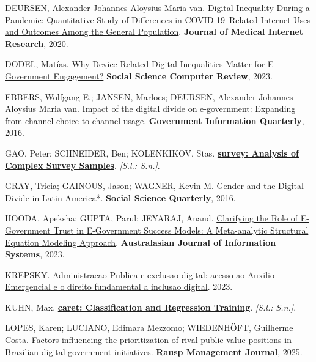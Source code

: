\documentclass[
  man,
  floatsintext,
  longtable,
  a4paper,
  nolmodern,
  notxfonts,
  notimes,
  colorlinks=true,linkcolor=blue,citecolor=blue,urlcolor=blue]{apa7}
\newlength{\cslhangindent}
\newenvironment{CSLReferences}[2] %
 {\begin{list}{}{%
  \setlength{\itemindent}{0pt}
  \setlength{\leftmargin}{0pt}
  \setlength{\parsep}{0pt}
  \ifodd #1
   \setlength{\leftmargin}{\cslhangindent}
   \setlength{\itemindent}{-1\cslhangindent}
  \fi
  \setlength{\itemsep}{#2\baselineskip}}}
 {\end{list}}
\begin{document}
\begin{CSLReferences}{0}{1}
DEURSEN, Alexander Johannes Aloysius Maria van.
\href{https://doi.org/10.2196/20073}{Digital Inequality During a
Pandemic: Quantitative Study of Differences in COVID-19--Related
Internet Uses and Outcomes Among the General Population}.
\textbf{Journal of Medical Internet Research}, 2020.

DODEL, Matías. \href{https://doi.org/10.1177/08944393231176595}{Why
Device-Related Digital Inequalities Matter for E-Government Engagement?}
\textbf{Social Science Computer Review}, 2023.

EBBERS, Wolfgang E.; JANSEN, Marloes; DEURSEN, Alexander Johannes
Aloysius Maria van.
\href{https://doi.org/10.1016/j.giq.2016.08.007}{Impact of the digital
divide on e-government: Expanding from channel choice to channel usage}.
\textbf{Government Information Quarterly}, 2016.

GAO, Peter; SCHNEIDER, Ben; KOLENKIKOV, Stas.
\textbf{\href{http://r-survey.r-forge.r-project.org/survey/}{survey:
Analysis of Complex Survey Samples}}. \emph{{[}S.l.: S.n.{]}}.

GRAY, Tricia; GAINOUS, Jason; WAGNER, Kevin M.
\href{https://doi.org/10.1111/ssqu.12270}{Gender and the Digital Divide
in Latin America*}. \textbf{Social Science Quarterly}, 2016.

HOODA, Apeksha; GUPTA, Parul; JEYARAJ, Anand.
\href{https://doi.org/10.3127/ajis.v27i0.4079}{Clarifying the Role of
E-Government Trust in E-Government Success Models: A Meta-analytic
Structural Equation Modeling Approach}. \textbf{Australasian Journal of
Information Systems}, 2023.

KREPSKY. \href{https://doi.org/10.37885/230312300}{Administracao Publica
e exclusao digital: acesso ao Auxilio Emergencial e o direito
fundamental a inclusao digital}. 2023.

KUHN, Max. \textbf{\href{https://github.com/topepo/caret/}{caret:
Classification and Regression Training}}. \emph{{[}S.l.: S.n.{]}}.

LOPES, Karen; LUCIANO, Edimara Mezzomo; WIEDENHÖFT, Guilherme Costa.
\href{https://doi.org/10.1108/rausp-11-2023-0225}{Factors influencing
the prioritization of rival public value positions in Brazilian digital
government initiatives}. \textbf{Rausp Management Journal}, 2025.


\end{CSLReferences}
\end{document}
